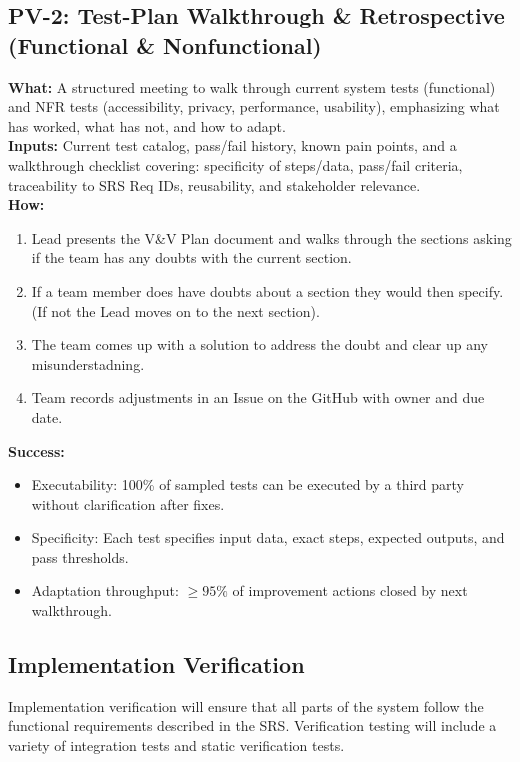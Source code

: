 \documentclass[12pt, titlepage]{article}
\begin{document}
\subsection*{PV-2: Test-Plan Walkthrough \& Retrospective (Functional \& Nonfunctional)}
\textbf{What:} A structured meeting to walk through current system tests (functional) and NFR tests (accessibility, privacy, performance, usability), emphasizing what has worked, what has not, and how to adapt. \\
\textbf{Inputs:} Current test catalog, pass/fail history, known pain points, and a walkthrough checklist covering: specificity of steps/data, pass/fail criteria, traceability to SRS Req IDs, reusability, and stakeholder relevance. \\
\textbf{How:}
\begin{enumerate}
  \item Lead presents the V\&V Plan document and walks through the sections asking if the team has any doubts with the current section.
  \item If a team member does have doubts about a section they would then specify. (If not the Lead moves on to the next section).
  \item The team comes up with a solution to address the doubt and clear up any misunderstadning.
  \item Team records adjustments in an Issue on the GitHub with owner and due date.
\end{enumerate}
\textbf{Success:}
\begin{itemize}
  \item Executability: 100\% of sampled tests can be executed by a third party without clarification after fixes.
  \item Specificity: Each test specifies input data, exact steps, expected outputs, and pass thresholds.
  \item Adaptation throughput: $\geq 95\%$ of improvement actions closed by next walkthrough.
\end{itemize}

\subsection{Implementation Verification}

Implementation verification will ensure that all parts of the system follow the functional requirements described in the SRS. Verification testing will include a variety of integration tests and static verification tests.  
\end{document}
